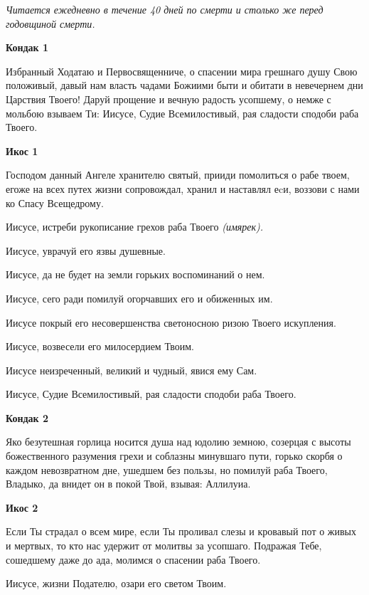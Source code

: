 \itshape Читается ежедневно в течение 40 дней по смерти и столько же перед годовщиной смерти.\normalfont{} 




\bfseries Кондак 1 \normalfont{}


Избранный Ходатаю и Первосвященниче, о спасении мира грешнаго душу Свою положивый, давый нам власть чадами Божиими быти и обитати в невечернем дни Царствия Твоего! Даруй прощение и вечную радость усопшему, о немже с мольбою взываем Ти: Иисусе, Судие Всемилостивый, рая сладости сподоби раба Твоего.




\bfseries Икос 1\normalfont{}


Господом данный Ангеле хранителю святый, прииди помолиться о рабе твоем, егоже на всех путех жизни сопровождал, хранил и наставлял еcи, воззови с нами ко Спасу Всещедрому. 


Иисусе, истреби рукописание грехов раба Твоего \itshape (имярек)\normalfont{}. 


Иисусе, уврачуй его язвы душевные. 


Иисусе, да не будет на земли горьких воспоминаний о нем. 


Иисусе, сего ради помилуй огорчавших его и обиженных им. 


Иисусе покрый его несовершенства светоносною ризою Твоего искупления. 


Иисусе, возвесели его милосердием Твоим. 


Иисусе неизреченный, великий и чудный, явися ему Сам. 


Иисусе, Судие Всемилостивый, рая сладости сподоби раба Твоего.




\bfseries Кондак 2\normalfont{}


Яко безутешная горлица носится душа над юдолию земною, созерцая с высоты божественного разумения грехи и соблазны минувшаго пути, горько скорбя о каждом невозвратном дне, ушедшем без пользы, но помилуй раба Твоего, Владыко, да внидет он в покой Твой, взывая: Аллилуиа.




\bfseries Икос 2\normalfont{}


Если Ты страдал о всем мире, если Ты проливал слезы и кровавый пот о живых и мертвых, то кто нас удержит от молитвы за усопшаго. Подражая Тебе, сошедшему даже до ада, молимся о спасении раба Твоего. 


Иисусе, жизни Подателю, озари его светом Твоим. 


